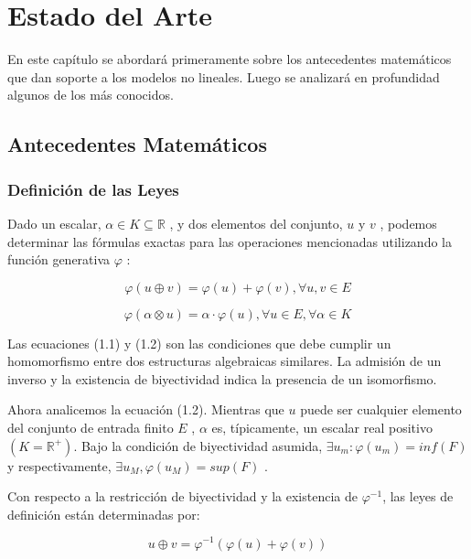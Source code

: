 \chapter{Estado del Arte}\label{chapter:state-of-the-art}

En este cap\'itulo se abordar\'a primeramente sobre los antecedentes matem\'aticos que dan soporte a los modelos no lineales. Luego se analizar\'a en profundidad algunos de los m\'as conocidos.

\section{Antecedentes Matemáticos}

\subsection{Definición de las Leyes}

Dado un escalar, $\alpha \in K \subseteq \mathbb{R}$ , y dos elementos del conjunto, $u$ y $v$ , podemos determinar las fórmulas exactas para las operaciones mencionadas utilizando la función generativa $\varphi$ :

\begin{equation}
	\varphi(u\oplus v) = \varphi(u)+\varphi(v), \forall u,v \in E
\end{equation}

\begin{equation}
	\varphi(\alpha \otimes u) = \alpha \cdot \varphi(u), \forall u \in E, \forall \alpha \in K
\end{equation}

Las ecuaciones (1.1) y (1.2) son las condiciones que debe cumplir un homomorfismo entre dos estructuras algebraicas similares. La admisi\'on de un inverso y la existencia de biyectividad indica la presencia de un isomorfismo.

Ahora analicemos la ecuación (1.2). Mientras que $u$ puede ser cualquier elemento del conjunto de entrada finito $E$ , $\alpha$ es, típicamente, un escalar real positivo $(K=\mathbb{R}^+)$. Bajo la condición de biyectividad asumida, $\exists u_m: \varphi( u_m ) = inf( F )$ y respectivamente, $\exists u_M , \varphi ( u_M ) = sup( F )$ .

Con respecto a la restricción de biyectividad y la existencia de $\varphi^{-1}$, las leyes de definición están determinadas por:

\begin{equation}
	u \oplus v = \varphi^{-1}(\varphi(u)+\varphi(v))	
\end{equation}

